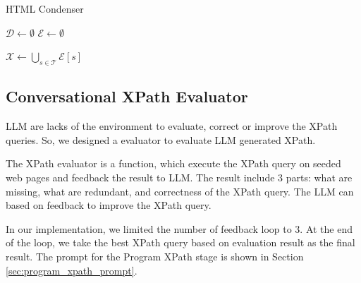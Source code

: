 \documentclass[a4paper]{article}
\begin{document}
\begin{algorithm*}[h]
  \SetAlgoLined
  \caption{HTML Condenser}
  \label{alg:condenser}

  $\mathcal{D} \gets \emptyset$ 
  $\mathcal{E} \gets \emptyset$ 
  

  $\mathcal{X} \gets \bigcup_{s \in \mathcal{T}} \mathcal{E}[s]$  
  
\end{algorithm*}

\subsection{Conversational XPath Evaluator}

LLM are lacks of the environment to evaluate, correct or improve the XPath queries. So, we designed a evaluator to evaluate LLM generated XPath.

The XPath evaluator is a function, which execute the XPath query on seeded web pages and feedback the result to LLM. The result include 3 parts: what are missing, what are redundant, and correctness of the XPath query. The LLM can based on feedback to improve the XPath query.

In our implementation, we limited the number of feedback loop to 3. At the end of the loop, we take the best XPath query based on evaluation result as the final result. The prompt for the Program XPath stage is shown in Section \ref{sec:program_xpath_prompt}.
\end{document}
